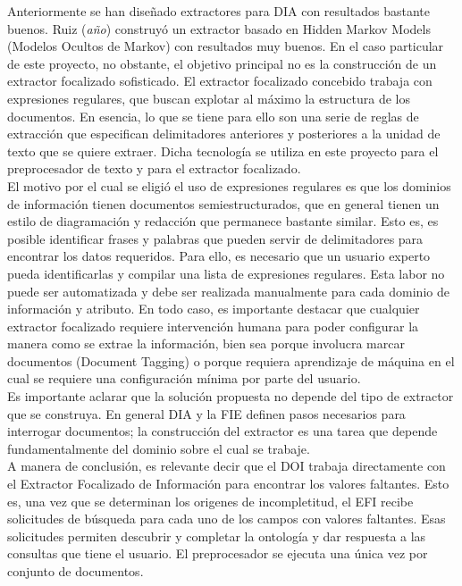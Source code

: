 Anteriormente se han diseñado extractores para DIA con resultados bastante buenos. Ruiz (\emph{año}) \cite{ruiz-HMM} construyó un extractor basado en Hidden Markov Models (Modelos Ocultos de Markov) con resultados muy buenos. En el caso particular de este proyecto, no obstante, el objetivo principal no es la construcción de un extractor focalizado sofisticado. El extractor focalizado concebido trabaja con expresiones regulares, que buscan explotar al máximo la estructura de los documentos. En esencia, lo que se tiene para ello son una serie de reglas de extracción que especifican delimitadores anteriores y posteriores a la unidad de texto que se quiere extraer. Dicha tecnología se utiliza en este proyecto para el preprocesador de texto y para el extractor focalizado.\\

El motivo por el cual se eligió el uso de expresiones regulares es que los dominios de información tienen documentos semiestructurados,  que en general tienen un estilo de diagramación y redacción que permanece bastante similar. Esto es, es posible identificar frases y palabras que pueden servir de delimitadores para encontrar los datos requeridos. Para ello, es necesario que un usuario experto pueda identificarlas y compilar una lista de expresiones regulares. Esta labor no puede ser automatizada y debe ser realizada manualmente para cada dominio de información y atributo. En todo caso, es importante destacar que cualquier extractor focalizado requiere intervención humana para poder configurar la manera como se extrae la información, bien sea porque involucra marcar documentos (Document Tagging) o porque requiera aprendizaje de máquina en el cual se requiere una configuración mínima por parte del usuario.\\

Es importante aclarar que la solución propuesta no depende del tipo de extractor que se construya. En general DIA y la FIE definen pasos necesarios para interrogar documentos; la construcción del extractor es una tarea que depende fundamentalmente del dominio sobre el cual se trabaje. \\

A manera de conclusión, es relevante decir que el DOI trabaja directamente con el Extractor Focalizado de Información para encontrar los valores faltantes. Esto es, una vez que se determinan los origenes de incompletitud, el EFI recibe solicitudes de búsqueda para cada uno de los campos con valores faltantes. Esas solicitudes permiten descubrir y completar la ontología y dar respuesta a las consultas que tiene el usuario. El preprocesador se ejecuta una única vez por conjunto de documentos. \\

